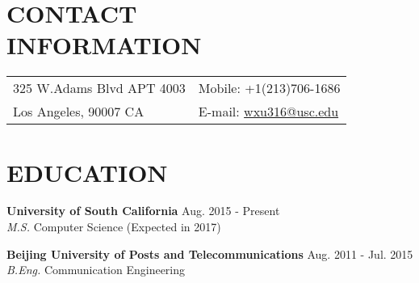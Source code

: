 \documentclass[margin,10pt]{res} %
\begin{document}
\begin{resume}

\section{CONTACT \\ INFORMATION}
\begin{tabular}{ll}
\leftmargini=4mm
325 W.Adams Blvd APT 4003& Mobile: +1(213)706-1686\\
Los Angeles, 90007 CA & E-mail: \href{mailto:wxu316@usc.edu}{wxu316@usc.edu}\\
\end{tabular}





\section{EDUCATION}

{\bf University of South California} \hfill Aug. 2015 - Present \\
{\sl M.S.} Computer Science (Expected in 2017)

{\bf Beijing University of Posts and Telecommunications} \hfill Aug. 2011 - Jul. 2015\\
{\sl B.Eng.} Communication Engineering



\end{resume}
\end{document}
